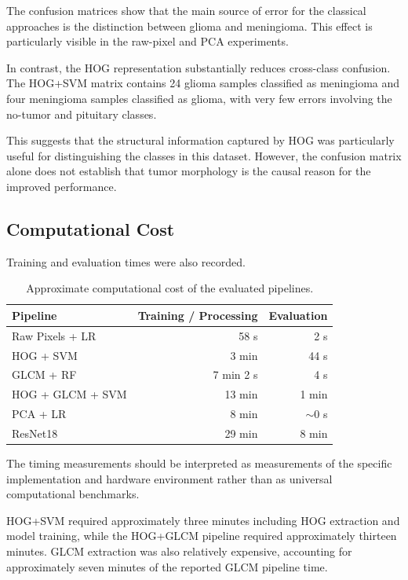 \documentclass[11pt,a4paper]{article}
\begin{document}
The confusion matrices show that the main source of error for the classical approaches is the distinction between glioma and meningioma. This effect is particularly visible in the raw-pixel and PCA experiments.

In contrast, the HOG representation substantially reduces cross-class confusion. The HOG+SVM matrix contains 24 glioma samples classified as meningioma and four meningioma samples classified as glioma, with very few errors involving the no-tumor and pituitary classes.

This suggests that the structural information captured by HOG was particularly useful for distinguishing the classes in this dataset. However, the confusion matrix alone does not establish that tumor morphology is the causal reason for the improved performance.

\subsection{Computational Cost}

Training and evaluation times were also recorded.

\begin{table}[H]
\centering
\caption{Approximate computational cost of the evaluated pipelines.}
\label{tab:runtime}
\begin{tabular}{lrr}
\toprule
\textbf{Pipeline} & \textbf{Training / Processing} & \textbf{Evaluation} \\
\midrule
Raw Pixels + LR & 58 s & 2 s \\
HOG + SVM & 3 min & 44 s \\
GLCM + RF & 7 min 2 s & 4 s \\
HOG + GLCM + SVM & 13 min & 1 min \\
PCA + LR & 8 min & $\sim$0 s \\
ResNet18 & 29 min & 8 min \\
\bottomrule
\end{tabular}
\end{table}

The timing measurements should be interpreted as measurements of the specific implementation and hardware environment rather than as universal computational benchmarks.

HOG+SVM required approximately three minutes including HOG extraction and model training, while the HOG+GLCM pipeline required approximately thirteen minutes. GLCM extraction was also relatively expensive, accounting for approximately seven minutes of the reported GLCM pipeline time.
\end{document}
